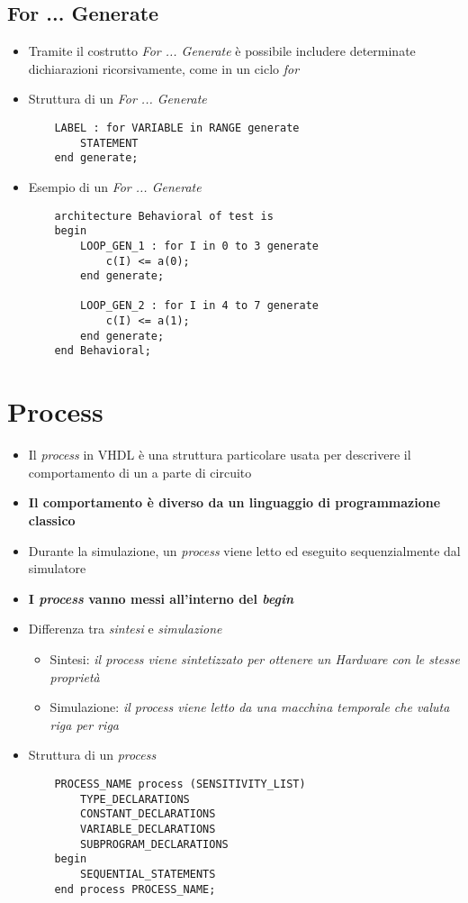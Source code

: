 \documentclass{article}
\begin{document}
\subsection{For ... Generate}
\begin{itemize}
  \item Tramite il costrutto \textit{For ... Generate} è possibile includere determinate dichiarazioni ricorsivamente, come in un ciclo \textit{for}
  \item Struttura di un \textit{For ... Generate}
        \begin{verbatim}
    LABEL : for VARIABLE in RANGE generate
        STATEMENT
    end generate;
	      \end{verbatim}

        \newpage

  \item Esempio di un \textit{For ... Generate}
        \begin{verbatim}
    architecture Behavioral of test is
    begin
        LOOP_GEN_1 : for I in 0 to 3 generate
            c(I) <= a(0);
        end generate;

        LOOP_GEN_2 : for I in 4 to 7 generate
            c(I) <= a(1);
        end generate;
    end Behavioral;
	      \end{verbatim}
\end{itemize}

\newpage

\section{Process}
\begin{itemize}
  \item Il \textit{process} in VHDL è una struttura particolare usata per descrivere il comportamento di un a parte di circuito
  \item \textbf{Il comportamento è diverso da un linguaggio di programmazione classico}
  \item Durante la simulazione, un \textit{process} viene letto ed eseguito sequenzialmente dal simulatore
  \item \textbf{I \textit{process} vanno messi all'interno del \textit{begin}}
  \item Differenza tra \textit{sintesi} e \textit{simulazione}
        \begin{itemize}
          \item Sintesi: \textit{il process viene sintetizzato per ottenere un Hardware con le stesse proprietà}
          \item Simulazione: \textit{il process viene letto da una macchina temporale che valuta riga per riga}
        \end{itemize}
  \item Struttura di un \textit{process}
        \begin{verbatim}
    PROCESS_NAME process (SENSITIVITY_LIST)
        TYPE_DECLARATIONS
        CONSTANT_DECLARATIONS
        VARIABLE_DECLARATIONS
        SUBPROGRAM_DECLARATIONS
    begin
        SEQUENTIAL_STATEMENTS
    end process PROCESS_NAME;
	      \end{verbatim}
\end{itemize}
\end{document}
